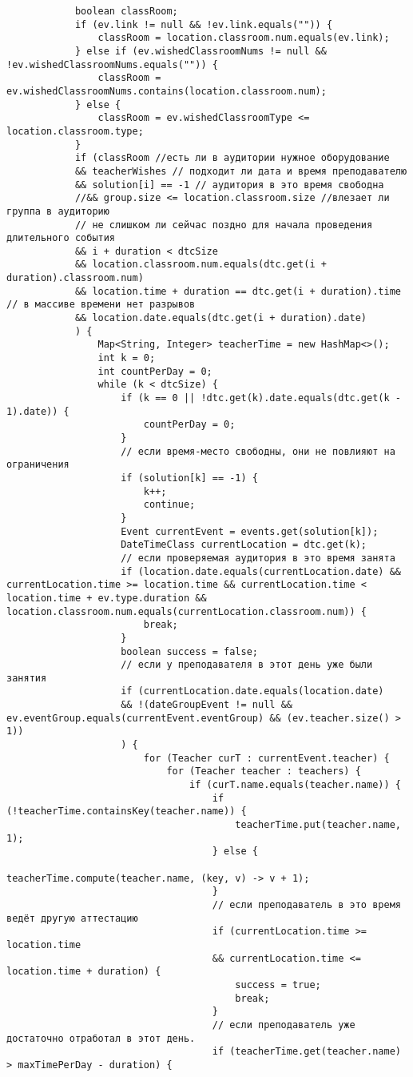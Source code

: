 \begin{lstlisting}
			boolean classRoom;
			if (ev.link != null && !ev.link.equals("")) {
				classRoom = location.classroom.num.equals(ev.link);
			} else if (ev.wishedClassroomNums != null && !ev.wishedClassroomNums.equals("")) {
				classRoom = ev.wishedClassroomNums.contains(location.classroom.num);
			} else {
				classRoom = ev.wishedClassroomType <= location.classroom.type;
			}
			if (classRoom //есть ли в аудитории нужное оборудование
			&& teacherWishes // подходит ли дата и время преподавателю
			&& solution[i] == -1 // аудитория в это время свободна
			//&& group.size <= location.classroom.size //влезает ли группа в аудиторию
			// не слишком ли сейчас поздно для начала проведения длительного события
			&& i + duration < dtcSize
			&& location.classroom.num.equals(dtc.get(i + duration).classroom.num)
			&& location.time + duration == dtc.get(i + duration).time // в массиве времени нет разрывов
			&& location.date.equals(dtc.get(i + duration).date)
			) {
				Map<String, Integer> teacherTime = new HashMap<>();
				int k = 0;
				int countPerDay = 0;
				while (k < dtcSize) {
					if (k == 0 || !dtc.get(k).date.equals(dtc.get(k - 1).date)) {
						countPerDay = 0;
					}
					// если время-место свободны, они не повлияют на ограничения
					if (solution[k] == -1) {
						k++;
						continue;
					}
					Event currentEvent = events.get(solution[k]);
					DateTimeClass currentLocation = dtc.get(k);
					// если проверяемая аудитория в это время занята
					if (location.date.equals(currentLocation.date) && currentLocation.time >= location.time && currentLocation.time < location.time + ev.type.duration && location.classroom.num.equals(currentLocation.classroom.num)) {
						break;
					}
					boolean success = false;
					// если у преподавателя в этот день уже были занятия
					if (currentLocation.date.equals(location.date)
					&& !(dateGroupEvent != null && ev.eventGroup.equals(currentEvent.eventGroup) && (ev.teacher.size() > 1))
					) {
						for (Teacher curT : currentEvent.teacher) {
							for (Teacher teacher : teachers) {
								if (curT.name.equals(teacher.name)) {
									if (!teacherTime.containsKey(teacher.name)) {
										teacherTime.put(teacher.name, 1);
									} else {
										teacherTime.compute(teacher.name, (key, v) -> v + 1);
									}
									// если преподаватель в это время ведёт другую аттестацию
									if (currentLocation.time >= location.time
									&& currentLocation.time <= location.time + duration) {
										success = true;
										break;
									}
									// если преподаватель уже достаточно отработал в этот день.
									if (teacherTime.get(teacher.name) > maxTimePerDay - duration) {

\end{lstlisting}
